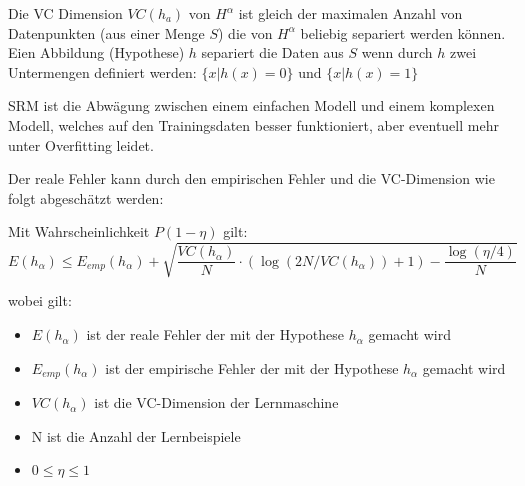 Die VC Dimension $VC(h_a)$ von $H^\alpha$ ist gleich der maximalen Anzahl von Datenpunkten
(aus einer Menge $S$) die von $H^\alpha$ beliebig separiert werden können.
Eien Abbildung (Hypothese) $h$ separiert die Daten aus $S$ wenn durch $h$ zwei Untermengen
definiert werden:
$\{x|h(x) = 0\} \text{ und } \{x|h(x) = 1\}$

SRM ist die Abwägung zwischen einem einfachen Modell und einem komplexen Modell,
welches auf den Trainingsdaten besser funktioniert, aber eventuell mehr unter
Overfitting leidet.

Der reale Fehler kann durch den empirischen Fehler und die VC-Dimension wie
folgt abgeschätzt werden:

Mit Wahrscheinlichkeit $P(1-\eta)$ gilt:
\begin{displaymath}
        E(h_\alpha) \leq E_{emp}(h_\alpha) + \sqrt{\frac{VC(h_\alpha)}{N} \cdot (\log(2 N / VC(h_\alpha)) + 1) - \frac{\log(\eta  / 4)}{N}}
\end{displaymath}


wobei gilt:

\begin{itemize}
    \item $E(h_\alpha)$ ist der reale Fehler der mit der Hypothese $h_\alpha$
        gemacht wird
    \item $E_{emp}(h_\alpha)$ ist der empirische Fehler der mit der Hypothese $h_\alpha$
        gemacht wird
    \item $VC(h_\alpha)$ ist die VC-Dimension der Lernmaschine
    \item N ist die Anzahl der Lernbeispiele
    \item $0 \leq \eta \leq 1$
\end{itemize}
